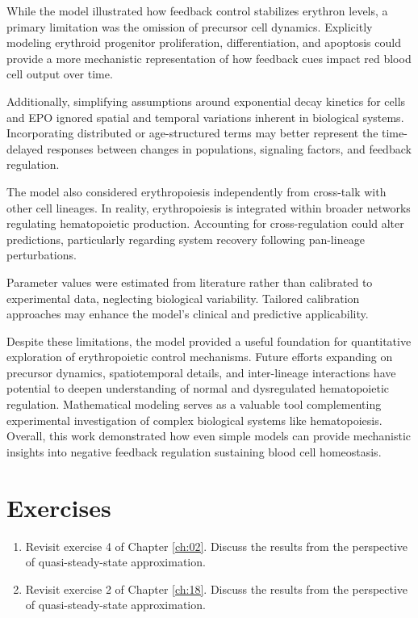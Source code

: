While the model illustrated how feedback control stabilizes erythron levels, a primary limitation was the omission of precursor cell dynamics. Explicitly modeling erythroid progenitor proliferation, differentiation, and apoptosis could provide a more mechanistic representation of how feedback cues impact red blood cell output over time.

Additionally, simplifying assumptions around exponential decay kinetics for cells and EPO ignored spatial and temporal variations inherent in biological systems. Incorporating distributed or age-structured terms may better represent the time-delayed responses between changes in populations, signaling factors, and feedback regulation.

The model also considered erythropoiesis independently from cross-talk with other cell lineages. In reality, erythropoiesis is integrated within broader networks regulating hematopoietic production. Accounting for cross-regulation could alter predictions, particularly regarding system recovery following pan-lineage perturbations.

Parameter values were estimated from literature rather than calibrated to experimental data, neglecting biological variability. Tailored calibration approaches may enhance the model's clinical and predictive applicability.

Despite these limitations, the model provided a useful foundation for quantitative exploration of erythropoietic control mechanisms. Future efforts expanding on precursor dynamics, spatiotemporal details, and inter-lineage interactions have potential to deepen understanding of normal and dysregulated hematopoietic regulation. Mathematical modeling serves as a valuable tool complementing experimental investigation of complex biological systems like hematopoiesis. Overall, this work demonstrated how even simple models can provide mechanistic insights into negative feedback regulation sustaining blood cell homeostasis.

\section{Exercises}

\begin{enumerate}
    \item Revisit exercise 4 of Chapter \ref{ch:02}. Discuss the results from the perspective of quasi-steady-state approximation.
  
    \item Revisit exercise 2 of Chapter \ref{ch:18}. Discuss the results from the perspective of quasi-steady-state approximation.
  
  \end{enumerate}
  